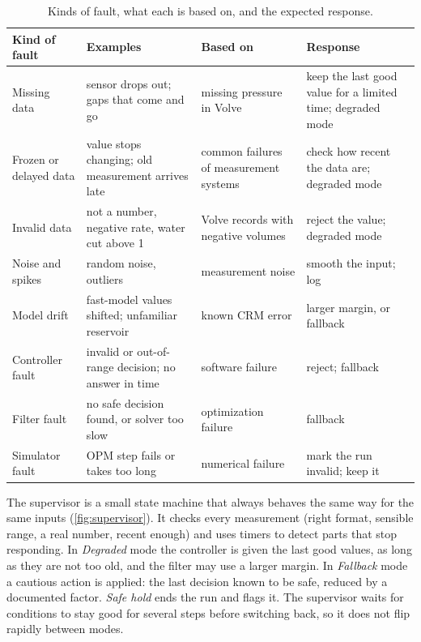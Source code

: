 \documentclass[11pt,letterpaper]{article}
\begin{document}
\begin{table}[!htbp]
\caption{Kinds of fault, what each is based on, and the expected response.}\label{tab:faults}
\small
\begin{tabularx}{\textwidth}{@{}P{2.3cm}P{4.2cm}LP{3.3cm}@{}}
\toprule
\textbf{Kind of fault} & \textbf{Examples} & \textbf{Based on} & \textbf{Response} \\
\midrule
Missing data & sensor drops out; gaps that come and go & missing pressure in Volve & keep the last good value for a limited time; degraded mode \\
Frozen or delayed data & value stops changing; old measurement arrives late & common failures of measurement systems & check how recent the data are; degraded mode \\
Invalid data & not a number, negative rate, water cut above 1 & Volve records with negative volumes & reject the value; degraded mode \\
Noise and spikes & random noise, outliers & measurement noise & smooth the input; log \\
Model drift & fast-model values shifted; unfamiliar reservoir & known CRM error \cite{mamghaderi2021crm} & larger margin, or fallback \\
Controller fault & invalid or out-of-range decision; no answer in time & software failure & reject; fallback \\
Filter fault & no safe decision found, or solver too slow & optimization failure & fallback \\
Simulator fault & OPM step fails or takes too long & numerical failure & mark the run invalid; keep it \\
\bottomrule
\end{tabularx}
\end{table}

The supervisor is a small state machine that always behaves the same way for the same
inputs (\cref{fig:supervisor}). It checks every measurement (right format, sensible range,
a real number, recent enough) and uses timers to detect parts that stop responding. In
\emph{Degraded} mode the controller is given the last good values, as long as they are not
too old, and the filter may use a larger margin. In \emph{Fallback} mode a cautious action
is applied: the last decision known to be safe, reduced by a documented factor. \emph{Safe
hold} ends the run and flags it. The supervisor waits for conditions to stay good for
several steps before switching back, so it does not flip rapidly between modes.
\end{document}
